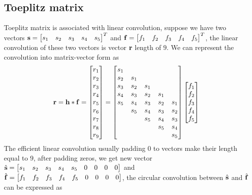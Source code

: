 \documentclass[revised,endfloat]{geophysics}
\begin{document}
\subsection{Toeplitz matrix}
Toeplitz matrix is associated with linear convolution, suppose we have two vectors ${\bf s} = \begin{bmatrix}  s_1 & s_2 & s_3 & s_4 & s_5  \end{bmatrix}^T$ and ${\bf f} =  \begin{bmatrix}  f_1 & f_2 & f_3 & f_4 & f_5  \end{bmatrix}^T$,  the linear convolution of these two vectors is vector ${\bf r}$ length of $9$. We can represent the convolution into matrix-vector form as
\begin{equation}
{\bf r} = {\bf  h} \ast {\bf f} = \begin{bmatrix}
r_1 \\
r_2 \\
r_3 \\
r_4 \\
r_5 \\
r_6 \\
r_7 \\
r_8 \\
r_9 \\
\end{bmatrix}
= \begin{bmatrix}
s_1    & \quad & \quad & \quad & \quad  \\ 
s_2    & s_1    & \quad & \quad & \quad  \\ 
s_3    & s_2    & s_1 & \quad & \quad \\ 
s_4    & s_3 & s_2 & s_1 & \quad  \\ 
s_5    & s_4 & s_3 & s_2 & s_1  \\ 
\quad & s_5 & s_4 & s_3 & s_2 \\ 
\quad & \quad & s_5 & s_4 & s_3  \\ 
\quad & \quad & \quad & s_5 & s_4 \\ 
\quad & \quad & \quad & \quad & s_5  \\ 
\end{bmatrix}
\begin{bmatrix}
f_1 \\
f_2 \\
f_3 \\
f_4 \\
f_5 \\
\end{bmatrix}
\end{equation}
The efficient linear convolution usually padding $0$ to vectors make their length equal to $9$, after padding zeros, we get new vector $\hat{\bf s} = \begin{bmatrix}  s_1 & s_2 & s_3 & s_4 & s_5 & 0 & 0 & 0 & 0 \end{bmatrix}$ and  $\hat{\bf f} = \begin{bmatrix}  f_1 & f_2 & f_3 & f_4 & f_5 & 0 & 0 & 0 & 0 \end{bmatrix} $, the circular convolution between $\hat{\bf s}$ and $\hat{\bf f}$ can be expressed as
\end{document}
